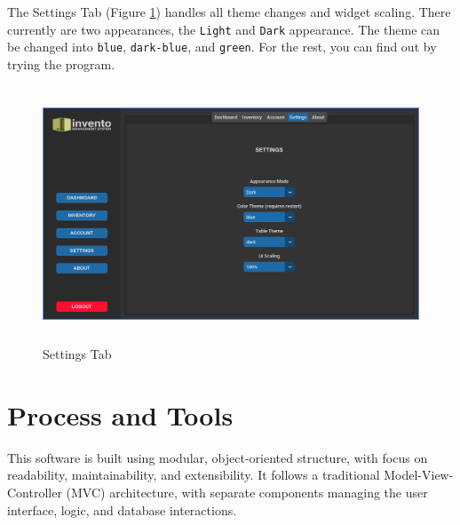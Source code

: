 \documentclass[12pt,a4paper]{article}
\renewcommand{\indent}{\hspace\parindent}
\begin{document}
        The Settings Tab (Figure \ref{fig:settings}) handles all theme changes 
        and widget scaling. There currently are two appearances, the 
        \texttt{Light} and \texttt{Dark} appearance. The theme can be changed into 
        \texttt{blue}, \texttt{dark-blue}, and \texttt{green}. For the rest, you can 
        find out by trying the program.

        \begin{figure}[ht]
          \centering
          \includegraphics[width=5in,height=3in]{Settings.png}
          \caption{Settings Tab}
          \label{fig:settings}
        \end{figure}


    \newpage
    \part{ Process and Tools }
    
    \indent
    This software is built using modular, object-oriented structure, with focus on 
    readability, maintainability, and extensibility. It follows a traditional 
    Model-View-Controller (MVC) architecture, with separate components managing the 
    user interface, logic, and database interactions.
\end{document}
